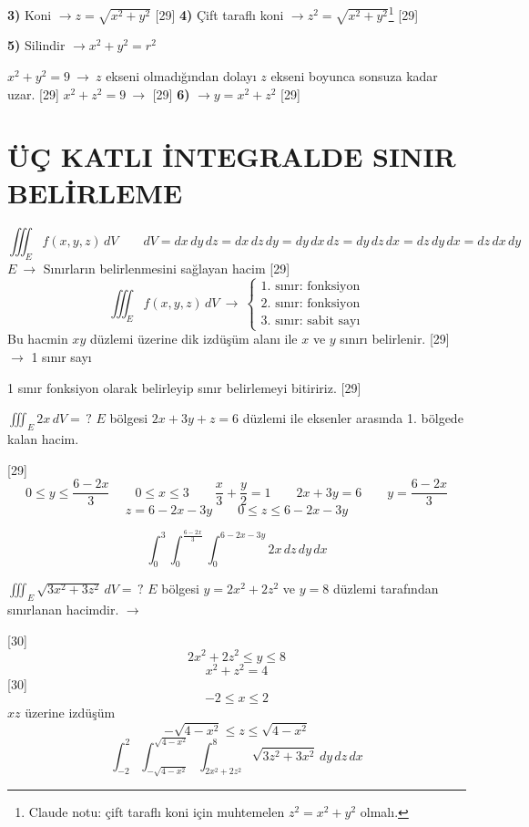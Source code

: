 \documentclass[11pt,a4paper]{article}
\begin{document}
\noindent\textbf{3)} Koni $\longrightarrow z=\sqrt{x^2+y^2}$
[29]
\noindent\textbf{4)} Çift taraflı koni $\longrightarrow z^2=\sqrt{x^2+y^2}$\footnote{Claude notu: çift taraflı koni için muhtemelen $z^2=x^2+y^2$ olmalı.}
[29]

\noindent\textbf{5)} Silindir $\longrightarrow x^2+y^2=r^2$

$x^2+y^2=9\ \longrightarrow\ z$ ekseni olmadığından dolayı $z$ ekseni boyunca sonsuza kadar uzar.
[29]
$x^2+z^2=9\ \longrightarrow$
[29]
\noindent\textbf{6)}  $\longrightarrow y=x^2+z^2$
[29]

\section{ÜÇ KATLI İNTEGRALDE SINIR BELİRLEME}
\[ \iiint_E f(x,y,z)\,dV\qquad dV=dx\,dy\,dz=dx\,dz\,dy=dy\,dx\,dz=dy\,dz\,dx=dz\,dy\,dx=dz\,dx\,dy \]
$E\ \longrightarrow$ Sınırların belirlenmesini sağlayan hacim
[29]
\[ \iiint_E f(x,y,z)\,dV\ \longrightarrow\ \begin{cases}\text{1. sınır: fonksiyon}\\\text{2. sınır: fonksiyon}\\\text{3. sınır: sabit sayı}\end{cases} \]
Bu hacmin $xy$ düzlemi üzerine dik izdüşüm alanı ile $x$ ve $y$ sınırı belirlenir.
[29]
$\longrightarrow$ 1 sınır sayı

1 sınır fonksiyon olarak belirleyip sınır belirlemeyi bitiririz.
[29]
\begin{ornek}
$\displaystyle\iiint_E 2x\,dV=\,?$ \quad $E$ bölgesi $2x+3y+z=6$ düzlemi ile eksenler arasında 1. bölgede kalan hacim.
\end{ornek}
[29]
\[ 0\le y\le\frac{6-2x}{3}\qquad 0\le x\le 3\qquad \frac x3+\frac y2=1\qquad 2x+3y=6\qquad y=\frac{6-2x}{3} \]
\[ z=6-2x-3y\qquad 0\le z\le 6-2x-3y \]

\[ \int_0^3\int_0^{\frac{6-2x}{3}}\int_0^{6-2x-3y}2x\,dz\,dy\,dx \]
\begin{ornek}
$\displaystyle\iiint_E\sqrt{3x^2+3z^2}\,dV=\,?$ \quad $E$ bölgesi $y=2x^2+2z^2$ ve $y=8$ düzlemi tarafından sınırlanan hacimdir. $\longrightarrow$ 
\end{ornek}
[30]
\[ 2x^2+2z^2\le y\le 8 \]
\[ x^2+z^2=4 \]
[30]
\[ -2\le x\le 2 \]
\noindent$xz$ üzerine izdüşüm
\[ -\sqrt{4-x^2}\le z\le\sqrt{4-x^2} \]
\[ \int_{-2}^{2}\int_{-\sqrt{4-x^2}}^{\sqrt{4-x^2}}\int_{2x^2+2z^2}^{8}\sqrt{3z^2+3x^2}\,dy\,dz\,dx \]
\end{document}
